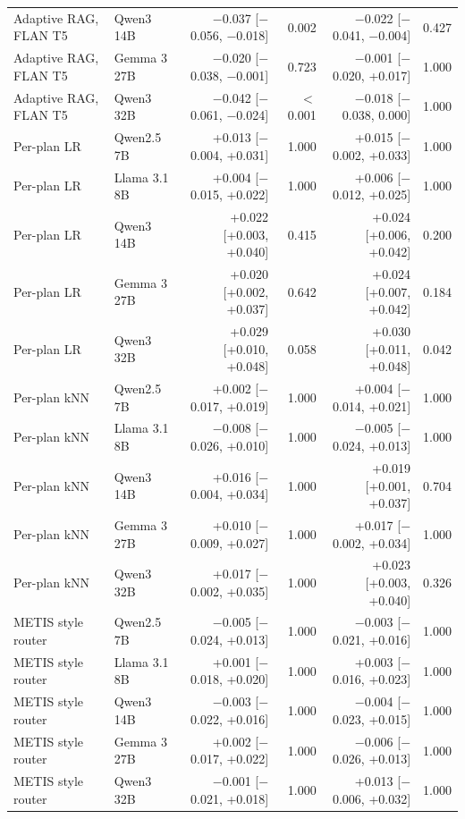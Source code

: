 \begin{table}[t]
\begin{tabular*}{\linewidth}{@{\extracolsep{\fill}}llrrrr}
Adaptive RAG, FLAN T5 & Qwen3 14B & $-$0.037 [$-$0.056, $-$0.018] & 0.002 & $-$0.022 [$-$0.041, $-$0.004] & 0.427 \\
Adaptive RAG, FLAN T5 & Gemma 3 27B & $-$0.020 [$-$0.038, $-$0.001] & 0.723 & $-$0.001 [$-$0.020, +0.017] & 1.000 \\
Adaptive RAG, FLAN T5 & Qwen3 32B & $-$0.042 [$-$0.061, $-$0.024] & $<$0.001 & $-$0.018 [$-$0.038, 0.000] & 1.000 \\
Per-plan LR & Qwen2.5 7B & +0.013 [$-$0.004, +0.031] & 1.000 & +0.015 [$-$0.002, +0.033] & 1.000 \\
Per-plan LR & Llama 3.1 8B & +0.004 [$-$0.015, +0.022] & 1.000 & +0.006 [$-$0.012, +0.025] & 1.000 \\
Per-plan LR & Qwen3 14B & +0.022 [+0.003, +0.040] & 0.415 & +0.024 [+0.006, +0.042] & 0.200 \\
Per-plan LR & Gemma 3 27B & +0.020 [+0.002, +0.037] & 0.642 & +0.024 [+0.007, +0.042] & 0.184 \\
Per-plan LR & Qwen3 32B & +0.029 [+0.010, +0.048] & 0.058 & +0.030 [+0.011, +0.048] & 0.042 \\
Per-plan kNN & Qwen2.5 7B & +0.002 [$-$0.017, +0.019] & 1.000 & +0.004 [$-$0.014, +0.021] & 1.000 \\
Per-plan kNN & Llama 3.1 8B & $-$0.008 [$-$0.026, +0.010] & 1.000 & $-$0.005 [$-$0.024, +0.013] & 1.000 \\
Per-plan kNN & Qwen3 14B & +0.016 [$-$0.004, +0.034] & 1.000 & +0.019 [+0.001, +0.037] & 0.704 \\
Per-plan kNN & Gemma 3 27B & +0.010 [$-$0.009, +0.027] & 1.000 & +0.017 [$-$0.002, +0.034] & 1.000 \\
Per-plan kNN & Qwen3 32B & +0.017 [$-$0.002, +0.035] & 1.000 & +0.023 [+0.003, +0.040] & 0.326 \\
METIS style router & Qwen2.5 7B & $-$0.005 [$-$0.024, +0.013] & 1.000 & $-$0.003 [$-$0.021, +0.016] & 1.000 \\
METIS style router & Llama 3.1 8B & +0.001 [$-$0.018, +0.020] & 1.000 & +0.003 [$-$0.016, +0.023] & 1.000 \\
METIS style router & Qwen3 14B & $-$0.003 [$-$0.022, +0.016] & 1.000 & $-$0.004 [$-$0.023, +0.015] & 1.000 \\
METIS style router & Gemma 3 27B & +0.002 [$-$0.017, +0.022] & 1.000 & $-$0.006 [$-$0.026, +0.013] & 1.000 \\
METIS style router & Qwen3 32B & $-$0.001 [$-$0.021, +0.018] & 1.000 & +0.013 [$-$0.006, +0.032] & 1.000 \\
\bottomrule
\end{tabular*}
\end{table}
